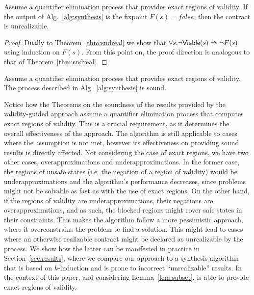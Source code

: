 
\begin{theorem}
\label{thm:sndunreal}

Assume a quantifier elimination process that provides exact regions of validity. If the output of Alg.~\ref{alg:synthesis} is the fixpoint $F(s) = false$, then the contract is unrealizable.
\end{theorem}
\begin{proof}
Dually to Theorem~\ref{thm:sndreal} we show that $\forall s. \lnot {\mathsf {Viable}}(s) \Rightarrow \lnot F(s)$ using induction on $F(s)$. From this point on, the proof direction is analogous to that of Theorem~\ref{thm:sndreal}.
\end{proof}


\begin{corollary}
Assume a quantifier elimination process that provides exact regions of validity. The process described in Alg.~\ref{alg:synthesis} is sound.
\end{corollary}

Notice how the Theorems on the soundness of the results provided by the validity-guided approach assume a quantifier elimination process that computes exact regions of validity. This is a crucial requirement, as it determines the overall effectiveness of the approach. The algorithm is still applicable to cases where the assumption is not met, however its effectiveness on providing sound results is directly affected. Not considering the case of exact regions, we have two other cases, overapproximations and underapproximations. In the former case, the regions of unsafe states (i.e. the negation of a region of validity) would be underapproximations and the algorithm's performance decreases, since problems might not be solvable as fast as with the use of exact regions. On the other hand, if the regions of validity are underapproximations, their negations are overapproximations, and as such, the blocked regions might cover safe states in their constraints. This makes the algorithm follow a more pessimistic approach, where it overconstrains the problem to find a solution. This might lead to cases where an otherwise realizable contract might be declared as unrealizable by the process. We show how the latter can be manifested in practice in Section~\ref{sec:results}, where we compare our approach to a synthesis algorithm that is based on $k$-induction and is prone to incorrect ``unrealizable'' results. In the context of this paper, and considering Lemma~\ref{lem:subset}, \aeval is able to provide exact regions of validity.
\fi


